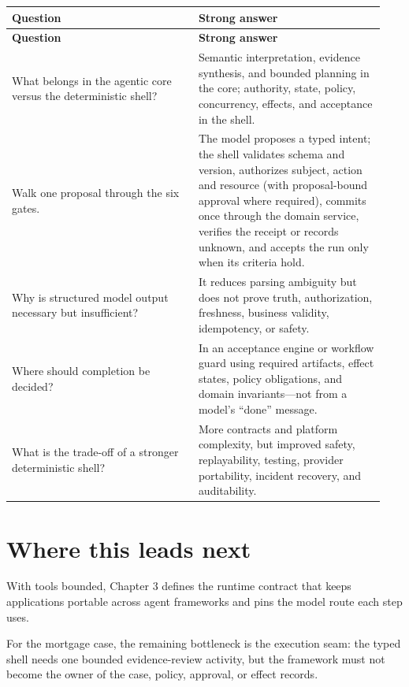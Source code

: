 \BookTableStart
\small
\begin{longtable}{@{}Y{0.4700\linewidth}Y{0.4700\linewidth}@{}}
\color{white}\bfseries \textbf{Question} & \color{white}\bfseries \textbf{Strong answer} \\
\endfirsthead
{}
\color{white}\bfseries \textbf{Question} & \color{white}\bfseries \textbf{Strong answer} \\
\endhead
What belongs in the agentic core versus the deterministic shell? & Semantic interpretation, evidence synthesis, and bounded planning in the core; authority, state, policy, concurrency, effects, and acceptance in the shell. \\
Walk one proposal through the six gates. & The model proposes a typed intent; the shell validates schema and version, authorizes subject, action and resource (with proposal-bound approval where required), commits once through the domain service, verifies the receipt or records unknown, and accepts the run only when its criteria hold. \\
Why is structured model output necessary but insufficient? & It reduces parsing ambiguity but does not prove truth, authorization, freshness, business validity, idempotency, or safety. \\
Where should completion be decided? & In an acceptance engine or workflow guard using required artifacts, effect states, policy obligations, and domain invariants—not from a model’s “done” message. \\
What is the trade-off of a stronger deterministic shell? & More contracts and platform complexity, but improved safety, replayability, testing, provider portability, incident recovery, and auditability. \\
\end{longtable}
\BookTableEnd

\section{Where this leads next}

With tools bounded, Chapter 3 defines the runtime contract that keeps applications portable across agent frameworks and pins the model route each step uses.\par

For the mortgage case, the remaining bottleneck is the execution seam: the typed shell needs one bounded evidence-review activity, but the framework must not become the owner of the case, policy, approval, or effect records.\par

